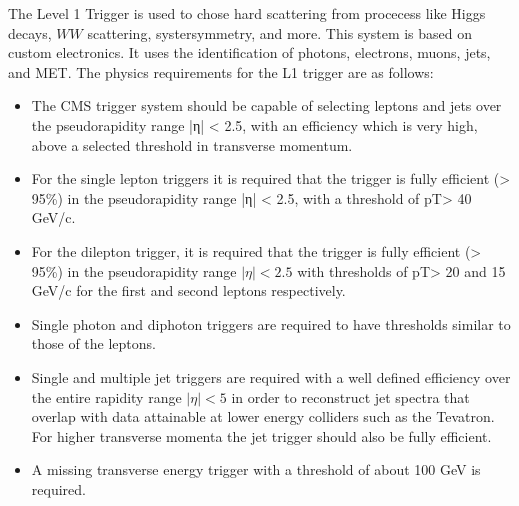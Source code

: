 The Level 1 Trigger is used to chose hard scattering from procecess like Higgs decays, $WW$ scattering, systersymmetry, and more.  This system is based on custom electronics.  It uses the identification of photons, electrons, muons, jets, and MET. The physics requirements for the L1 trigger are as follows:~\cite{Bayatyan:706847}
\begin{itemize}
  \item
    The CMS trigger system should be capable of selecting leptons and jets over the pseudorapidity range |η| < 2.5, with an efficiency which is very high, above a selected threshold in transverse momentum.
  \item
    For the single lepton triggers it is required that the trigger is fully efficient (> 95\%) in the pseudorapidity range |η| < 2.5, with a threshold of pT> 40 GeV/c.
  \item
    For the dilepton trigger, it is required that the trigger is fully efficient (> 95\%) in the pseudorapidity range $|\eta| < 2.5$ with thresholds of pT> 20 and 15 GeV/c for the first and second leptons respectively.
  \item
    Single photon and diphoton triggers are required to have thresholds similar to those of the leptons.
  \item
    Single and multiple jet triggers are required with a well defined efficiency over the entire rapidity range $|\eta| < 5$ in order to reconstruct jet spectra that overlap with data attainable at lower energy colliders such as the Tevatron. For higher transverse momenta the jet trigger should also be fully efficient.
  \item
    A missing transverse energy trigger with a threshold of about 100 GeV is required.
\end{itemize}